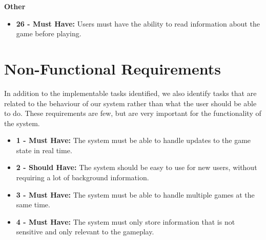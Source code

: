 \documentclass{l4proj}
\begin{document}
\textbf{Other}
\begin{itemize}
    \item[] \textbf{26 - Must Have:} Users must have the ability to read information about the game before playing.
\end{itemize}

\section{Non-Functional Requirements}
In addition to the implementable tasks identified, we also identify tasks that are related to the behaviour of our system rather than what the user should be able to do. These requirements are few, but are very important for the functionality of the system.  

\begin{itemize}
    \item[] \textbf{1 - Must Have:}  The system must be able to handle updates to the game state in real time.
    \item[] \textbf{2 - Should Have:} The system should be easy to use for new users, without requiring a lot of background information.
    \item[] \textbf{3 - Must Have:} The system must be able to handle multiple games at the same time.
    \item[] \textbf{4 - Must Have:} The system must only store information that is not sensitive and only relevant to the gameplay.
\end{itemize}
\end{document}
